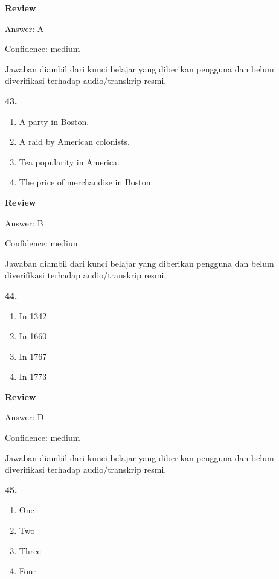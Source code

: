 \documentclass[12pt]{article}
\begin{document}
\par
\begingroup
\setlength{\parskip}{0pt}
\setlength{\parindent}{0pt}
\textbf{Review}\par
Answer: A\par
Confidence: medium\par
Jawaban diambil dari kunci belajar yang diberikan pengguna dan belum diverifikasi terhadap audio/transkrip resmi.\par
\endgroup
\par
\vspace{0.25\baselineskip}
\noindent\textbf{43.}
\begin{enumerate}[label=(\Alph*),leftmargin=*,itemsep=0.2em]
\item A party in Boston.
\item A raid by American colonists.
\item Tea popularity in America.
\item The price of merchandise in Boston.
\end{enumerate}
\par
\begingroup
\setlength{\parskip}{0pt}
\setlength{\parindent}{0pt}
\textbf{Review}\par
Answer: B\par
Confidence: medium\par
Jawaban diambil dari kunci belajar yang diberikan pengguna dan belum diverifikasi terhadap audio/transkrip resmi.\par
\endgroup
\par
\vspace{0.25\baselineskip}
\noindent\textbf{44.}
\begin{enumerate}[label=(\Alph*),leftmargin=*,itemsep=0.2em]
\item In 1342
\item In 1660
\item In 1767
\item In 1773
\end{enumerate}
\par
\begingroup
\setlength{\parskip}{0pt}
\setlength{\parindent}{0pt}
\textbf{Review}\par
Answer: D\par
Confidence: medium\par
Jawaban diambil dari kunci belajar yang diberikan pengguna dan belum diverifikasi terhadap audio/transkrip resmi.\par
\endgroup
\par
\vspace{0.25\baselineskip}
\noindent\textbf{45.}
\begin{enumerate}[label=(\Alph*),leftmargin=*,itemsep=0.2em]
\item One
\item Two
\item Three
\item Four
\end{enumerate}
\end{document}
